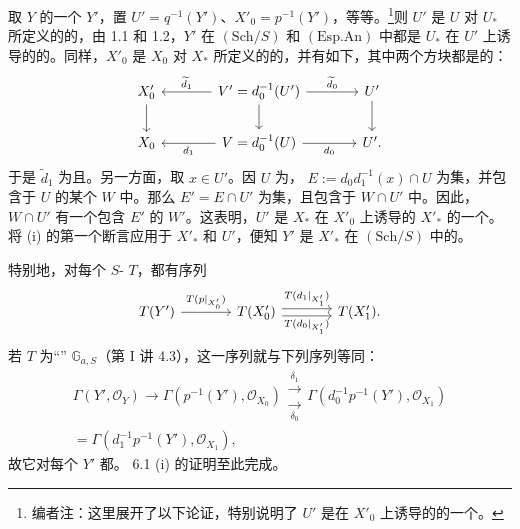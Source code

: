 取 $Y$ 的一个 $Y'$，置 $U'=q^{-1}(Y')$、$X'_0=p^{-1}(Y')$，等等。\footnote{编者注：这里展开了以下论证，特别说明了 $U'$ 是在 $X'_0$ 上诱导的的一个。}则 $U'$ 是 $U$ 对 $U_*$ 所定义的的，由 1.1 和 1.2，$Y'$ 在 $(\mathrm{Sch}/S)$ 和 $(\mathrm{Esp.An})$ 中都是 $U_*$ 在 $U'$ 上诱导的的。同样，$X'_0$ 是 $X_0$ 对 $X_*$ 所定义的的，并有如下，其中两个方块都是的：
\[
\begin{tikzcd}[column sep=large]
X'_0\arrow[d]&V'=d_0^{-1}(U')\arrow[l,"\widetilde d_1"']\arrow[r,"\widetilde d_0"]\arrow[d]&U'\arrow[d]\\
X_0&V=d_0^{-1}(U)\arrow[l,"d_1"]\arrow[r,"d_0"']&U'.
\end{tikzcd}
\]
于是 $\widetilde d_1$ 为且。另一方面，取 $x\in U'$。因 $U$ 为， $E:=d_0d_1^{-1}(x)\cap U$ 为集，并包含于 $U$ 的某个 $W$ 中。那么 $E'=E\cap U'$ 为集，且包含于 $W\cap U'$ 中。因此，$W\cap U'$ 有一个包含 $E'$ 的 $W'$。这表明，$U'$ 是 $X_*$ 在 $X'_0$ 上诱导的 $X'_*$ 的一个。将 (i) 的第一个断言应用于 $X'_*$ 和 $U'$，便知 $Y'$ 是 $X'_*$ 在 $(\mathrm{Sch}/S)$ 中的。

特别地，对每个 $S$- $T$，都有序列
\[
\begin{tikzcd}[column sep=large]
T(Y')\arrow[r,"T(p|_{X'_0})"]&T(X'_0)\arrow[r,shift left=.6ex,"T(d_1|_{X'_1})"]\arrow[r,shift right=.6ex,"T(d_0|_{X'_1})"']&T(X'_1).
\end{tikzcd}
\]
若 $T$ 为“” $\mathbb G_{a,S}$（第 I 讲 4.3），这一序列就与下列序列等同：
\[
\begin{gathered}
\Gamma(Y',\mathcal O_Y)\longrightarrow\Gamma(p^{-1}(Y'),\mathcal O_{X_0})
\mathrel{\substack{\xrightarrow{\delta_1}\\[-.6ex]\xrightarrow[\delta_0]{}}}
\Gamma(d_0^{-1}p^{-1}(Y'),\mathcal O_{X_1})\\
=\Gamma(d_1^{-1}p^{-1}(Y'),\mathcal O_{X_1}),
\end{gathered}
\]
故它对每个 $Y'$ 都。 6.1 (i) 的证明至此完成。


